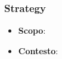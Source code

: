 \subsubsection{Strategy}

\begin{itemize}

	\item \textbf{Scopo}:
	\item \textbf{Contesto}:

\end{itemize}

%
%
%
%
%
%
%
%
%
%
%
